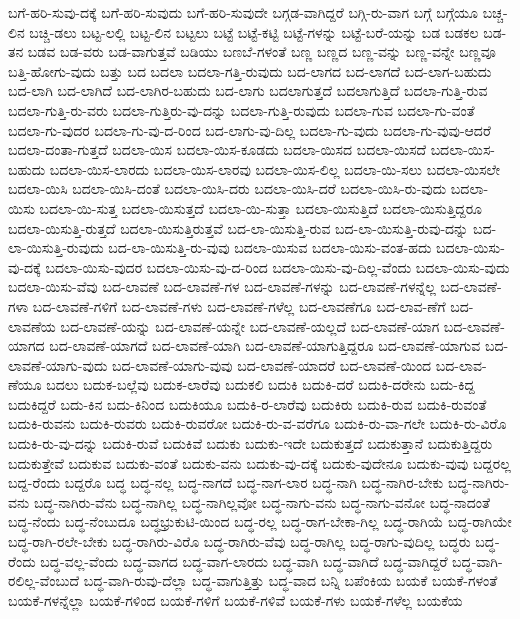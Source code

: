 {ಬಗೆ-ಹರಿ-ಸುವು-ದಕ್ಕೆ
ಬಗೆ-ಹರಿ-ಸುವುದು
ಬಗೆ-ಹರಿ-ಸುವುದೇ
ಬಗ್ಗಡ-ವಾಗಿದ್ದರೆ
ಬಗ್ಗಿ-ರು-ವಾಗ
ಬಗ್ಗೆ
ಬಗ್ಗೆಯೂ
ಬಚ್ಚ-ಲಿನ
ಬಚ್ಚಿ-ಡಲು
ಬಟ್ಟ-ಲಲ್ಲಿ
ಬಟ್ಟ-ಲಿನ
ಬಟ್ಟಲು
ಬಟ್ಟೆ
ಬಟ್ಟೆ-ಕಟ್ಟಿ
ಬಟ್ಟೆ-ಗಳನ್ನು
ಬಟ್ಟೆ-ಬರೆ-ಯನ್ನು
ಬಡ
ಬಡಕಲ
ಬಡ-ತನ
ಬಡವ
ಬಡ-ವರು
ಬಡ-ವಾಗುತ್ತವೆ
ಬಡಿಯು
ಬಣಬೆ-ಗಳಂತೆ
ಬಣ್ಣ
ಬಣ್ಣದ
ಬಣ್ಣ-ವನ್ನು
ಬಣ್ಣ-ವನ್ನೇ
ಬಣ್ಣವೂ
ಬತ್ತಿ-ಹೋಗು-ವುದು
ಬತ್ತು
ಬದ
ಬದಲಾ
ಬದಲಾ-ಗತ್ತಿ-ರುವುದು
ಬದ-ಲಾಗದ
ಬದ-ಲಾಗದೆ
ಬದ-ಲಾಗ-ಬಹುದು
ಬದ-ಲಾಗಿ
ಬದ-ಲಾಗಿದೆ
ಬದ-ಲಾಗಿರ-ಬಹುದು
ಬದ-ಲಾಗು
ಬದಲಾಗುತ್ತದೆ
ಬದಲಾಗುತ್ತಿದೆ
ಬದಲಾ-ಗುತ್ತಿ-ರುವ
ಬದಲಾ-ಗುತ್ತಿ-ರು-ವರು
ಬದಲಾ-ಗುತ್ತಿರು-ವು-ದನ್ನು
ಬದಲಾ-ಗುತ್ತಿ-ರುವುದು
ಬದಲಾ-ಗುವ
ಬದಲಾ-ಗು-ವಂತೆ
ಬದಲಾ-ಗು-ವುದರ
ಬದಲಾ-ಗು-ವು-ದ-ರಿಂದ
ಬದ-ಲಾಗು-ವು-ದಿಲ್ಲ
ಬದಲಾ-ಗು-ವುದು
ಬದಲಾ-ಗು-ವುವು-ಆದರೆ
ಬದಲಾ-ದಂತಾ-ಗುತ್ತದೆ
ಬದಲಾ-ಯಿಸ
ಬದಲಾ-ಯಿಸ-ಕೂಡದು
ಬದಲಾ-ಯಿಸದ
ಬದಲಾ-ಯಿಸದೆ
ಬದಲಾ-ಯಿಸ-ಬಹುದು
ಬದಲಾ-ಯಿಸ-ಲಾರದು
ಬದಲಾ-ಯಿಸ-ಲಾರವು
ಬದಲಾ-ಯಿಸ-ಲಿಲ್ಲ
ಬದಲಾ-ಯಿ-ಸಲು
ಬದಲಾ-ಯಿಸಲೇ
ಬದಲಾ-ಯಿಸಿ
ಬದಲಾ-ಯಿಸಿ-ದಂತೆ
ಬದಲಾ-ಯಿಸಿ-ದರು
ಬದಲಾ-ಯಿಸಿ-ದರೆ
ಬದಲಾ-ಯಿಸಿ-ರು-ವುದು
ಬದಲಾ-ಯಿಸು
ಬದಲಾ-ಯಿ-ಸುತ್ತ
ಬದಲಾ-ಯಿಸುತ್ತದೆ
ಬದಲಾ-ಯಿ-ಸುತ್ತಾ
ಬದಲಾ-ಯಿಸುತ್ತಿದೆ
ಬದಲಾ-ಯಿಸುತ್ತಿದ್ದರೂ
ಬದಲಾ-ಯಿಸುತ್ತಿ-ರುತ್ತದೆ
ಬದಲಾ-ಯಿಸುತ್ತಿರುತ್ತವೆ
ಬದ-ಲಾ-ಯಿಸುತ್ತಿ-ರುವ
ಬದ-ಲಾ-ಯಿಸುತ್ತಿ-ರುವು-ದನ್ನು
ಬದ-ಲಾ-ಯಿಸುತ್ತಿ-ರುವುದು
ಬದ-ಲಾ-ಯಿಸುತ್ತಿ-ರು-ವುವು
ಬದಲಾ-ಯಿಸುವ
ಬದಲಾ-ಯಿಸು-ವಂತ-ಹದು
ಬದಲಾ-ಯಿಸು-ವು-ದಕ್ಕೆ
ಬದಲಾ-ಯಿಸು-ವುದರ
ಬದಲಾ-ಯಿಸು-ವು-ದ-ರಿಂದ
ಬದಲಾ-ಯಿಸು-ವು-ದಿಲ್ಲ-ವೆಂದು
ಬದಲಾ-ಯಿಸು-ವುದು
ಬದಲಾ-ಯಿಸು-ವೆವು
ಬದ-ಲಾವಣೆ
ಬದ-ಲಾವಣೆ-ಗಳ
ಬದ-ಲಾವಣೆ-ಗಳನ್ನು
ಬದ-ಲಾವಣೆ-ಗಳನ್ನೆಲ್ಲ
ಬದ-ಲಾವಣೆ-ಗಳಾ
ಬದ-ಲಾವಣೆ-ಗಳಿಗೆ
ಬದ-ಲಾವಣೆ-ಗಳು
ಬದ-ಲಾವಣೆ-ಗಳೆಲ್ಲ
ಬದ-ಲಾವಣೆಗೂ
ಬದ-ಲಾವ-ಣೆಗೆ
ಬದ-ಲಾವಣೆಯ
ಬದ-ಲಾವಣೆ-ಯನ್ನು
ಬದ-ಲಾವಣೆ-ಯನ್ನೇ
ಬದ-ಲಾವಣೆ-ಯಲ್ಲದೆ
ಬದ-ಲಾವಣೆ-ಯಾಗ
ಬದ-ಲಾವಣೆ-ಯಾಗದ
ಬದ-ಲಾವಣೆ-ಯಾಗದೆ
ಬದ-ಲಾವಣೆ-ಯಾಗಿ
ಬದ-ಲಾವಣೆ-ಯಾಗುತ್ತಿದ್ದರೂ
ಬದ-ಲಾವಣೆ-ಯಾಗುವ
ಬದ-ಲಾವಣೆ-ಯಾಗು-ವುದು
ಬದ-ಲಾವಣೆ-ಯಾಗು-ವುವು
ಬದ-ಲಾವಣೆ-ಯಾದರೆ
ಬದ-ಲಾವಣೆ-ಯಿಂದ
ಬದ-ಲಾವ-ಣೆಯೂ
ಬದಲು
ಬದುಕ-ಬಲ್ಲೆವು
ಬದುಕ-ಲಾರೆವು
ಬದುಕಲಿ
ಬದುಕಿ
ಬದುಕಿ-ದರೆ
ಬದುಕಿ-ದರೇನು
ಬದು-ಕಿದ್ದ
ಬದುಕಿದ್ದರೆ
ಬದು-ಕಿನ
ಬದು-ಕಿನಿಂದ
ಬದುಕಿಯೂ
ಬದುಕಿ-ರ-ಲಾರೆವು
ಬದುಕಿರು
ಬದುಕಿ-ರುವ
ಬದುಕಿ-ರುವಂತೆ
ಬದುಕಿ-ರುವನು
ಬದುಕಿ-ರುವರು
ಬದುಕಿ-ರುವರೋ
ಬದುಕಿ-ರು-ವ-ವರೆಗೂ
ಬದುಕಿ-ರು-ವಾ-ಗಲೇ
ಬದುಕಿ-ರು-ವಿರೊ
ಬದುಕಿ-ರು-ವು-ದನ್ನು
ಬದುಕಿ-ರುವೆ
ಬದುಕಿವೆ
ಬದುಕು
ಬದುಕು-ಇದೇ
ಬದುಕುತ್ತದೆ
ಬದುಕುತ್ತಾನೆ
ಬದುಕುತ್ತಿದ್ದರು
ಬದುಕುತ್ತೇವೆ
ಬದುಕುವ
ಬದುಕು-ವಂತೆ
ಬದುಕು-ವನು
ಬದುಕು-ವು-ದಕ್ಕೆ
ಬದುಕು-ವುದೇನೂ
ಬದುಕು-ವುವು
ಬದ್ದರಲ್ಲ
ಬದ್ದ-ರೆಂದು
ಬದ್ದರೊ
ಬದ್ಧ
ಬದ್ಧ-ನಲ್ಲ
ಬದ್ಧ-ನಾಗದೆ
ಬದ್ಧ-ನಾಗ-ಲಾರ
ಬದ್ಧ-ನಾಗಿ
ಬದ್ಧ-ನಾಗಿರ-ಬೇಕು
ಬದ್ಧ-ನಾಗಿರು-ವನು
ಬದ್ಧ-ನಾಗಿರು-ವೆನು
ಬದ್ಧ-ನಾಗಿಲ್ಲ
ಬದ್ಧ-ನಾಗಿಲ್ಲವೋ
ಬದ್ಧ-ನಾಗು-ವನು
ಬದ್ಧ-ನಾಗು-ವನೋ
ಬದ್ಧ-ನಾದಂತೆ
ಬದ್ಧ-ನೆಂದು
ಬದ್ಧ-ನೆಂಬುದೂ
ಬದ್ಧಭ್ರುಕುಟಿ-ಯಿಂದ
ಬದ್ಧ-ರಲ್ಲ
ಬದ್ಧ-ರಾಗ-ಬೇಕಾ-ಗಿಲ್ಲ
ಬದ್ಧ-ರಾಗಿಯೆ
ಬದ್ಧ-ರಾಗಿಯೇ
ಬದ್ಧ-ರಾಗಿ-ರಲೇ-ಬೇಕು
ಬದ್ಧ-ರಾಗಿರು-ವಿರೊ
ಬದ್ಧ-ರಾಗಿರು-ವೆವು
ಬದ್ಧ-ರಾಗಿಲ್ಲ
ಬದ್ಧ-ರಾಗು-ವುದಿಲ್ಲ
ಬದ್ಧರು
ಬದ್ಧ-ರೆಂದು
ಬದ್ಧ-ವಲ್ಲ-ವೆಂದು
ಬದ್ಧ-ವಾಗದ
ಬದ್ಧ-ವಾಗ-ಲಾರದು
ಬದ್ಧ-ವಾಗಿ
ಬದ್ಧ-ವಾಗಿದೆ
ಬದ್ಧ-ವಾಗಿದ್ದರೆ
ಬದ್ಧ-ವಾಗಿ-ರಲಿಲ್ಲ-ವೆಂಬುದೆ
ಬದ್ಧ-ವಾಗಿ-ರುವು-ದೆಲ್ಲಾ
ಬದ್ಧ-ವಾಗುತ್ತಿತ್ತು
ಬದ್ಧ-ವಾದ
ಬನ್ನಿ
ಬಪೆಂಕಿಯ
ಬಯಕೆ
ಬಯಕೆ-ಗಳಂತೆ
ಬಯಕೆ-ಗಳನ್ನೆಲ್ಲಾ
ಬಯಕೆ-ಗಳಿಂದ
ಬಯಕೆ-ಗಳಿಗೆ
ಬಯಕೆ-ಗಳಿವೆ
ಬಯಕೆ-ಗಳು
ಬಯಕೆ-ಗಳೆಲ್ಲ
ಬಯಕೆಯ
}
